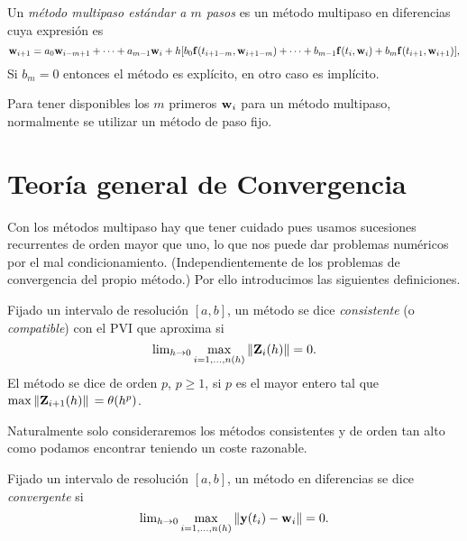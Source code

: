 \begin{definition}
    Un \emph{método multipaso estándar a $m$ pasos}
    es un método multipaso en diferencias cuya expresión es
    \begin{equation*}
        \vb{w}{}_{i+1} = a_0\vb{w}{}_{i-m+1} + \dots + a_{m-1}\vb{w}{}_i + h[
            b_0\vb{f}{}(t_{i+1-m},\vb{w}{}_{i+1-m}) + \dots + b_{m-1}\vb{f}{}(t_i,\vb{w}{}_i)
            + b_m\vb{f}{}(t_{i+1},\vb{w}{}_{i+1})
        ],
    \end{equation*}
    Si $b_m = 0$ entonces el método es explícito, en otro caso es implícito.
\end{definition}

Para tener disponibles los $m$ primeros $\vb{w}{}_i$ para un método multipaso,
normalmente se utilizar un método de paso fijo.

\section{Teoría general de Convergencia}

Con los métodos multipaso hay que tener cuidado pues usamos
sucesiones recurrentes de orden mayor que uno,
lo que nos puede dar problemas numéricos
por el mal condicionamiento.
(Independientemente de los problemas de convergencia del propio método.)
Por ello introducimos las siguientes definiciones.

\begin{definition}
    Fijado un intervalo de resolución $[a, b]$,
    un método se dice \emph{consistente} (o \emph{compatible})
    con el PVI que aproxima si
    \begin{equation*}
        \lim\nolimits_{h\to 0} \max_{i = 1,\ldots,n(h)}{\norm{\vb{Z}{}_i(h)}} = 0.
	\end{equation*}
	El método se dice de orden $p$, $p \geq 1$, si $p$ es el mayor entero
	tal que $\max{\norm*{\vb{Z}{}_{i+1}(h)}} = \theta(h^p)$.
\end{definition}

Naturalmente solo consideraremos los métodos consistentes y de orden tan
alto como podamos encontrar teniendo un coste razonable.

\begin{definition}
    Fijado un intervalo de resolución $[a, b]$,
    un método en diferencias se dice \emph{convergente} si
    \begin{equation*}
        \lim\nolimits_{h \to 0}
            \max_{i = 1,\ldots,n(h)}{\norm{\vb{y}{}(t_i)-\vb{w}{}_i}} = 0.
    \end{equation*}
\end{definition}

